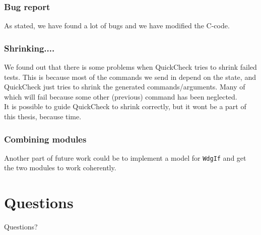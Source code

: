 \documentclass{beamer}
\begin{document}
\begin{frame}
  \frametitle{Bug report}
  As stated, we have found a lot of bugs and we have modified the C-code.
\end{frame}

\begin{frame}
  \frametitle{Shrinking....}
  We found out that there is some problems when QuickCheck tries to
  shrink failed tests. This is because most of the commands we send in
  depend on the state, and QuickCheck just tries to shrink the generated
  commands/arguments. Many of which will fail because some other
  (previous) command has been neglected.\\[0.5cm]

  It is possible to guide QuickCheck to shrink correctly, but it wont
  be a part of this thesis, because time.
\end{frame}

\begin{frame}[fragile]
  \frametitle{Combining modules}
  Another part of future work could be to implement a model for
  \verb!WdgIf! and get the two modules to work coherently.
\end{frame}



\section{Questions}

\begin{frame}
  \Huge{\centerline{Questions?}}
\end{frame}
\end{document}
